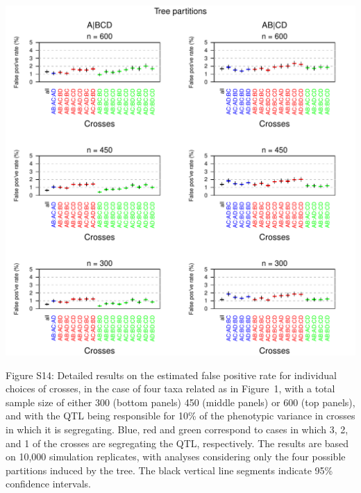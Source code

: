 \documentclass[letterpaper,twoside]{article}
\begin{document}
{\centering
\includegraphics{SuppFigs/detailedfp_treepart.pdf}}

\bigskip \noindent
Figure S14: Detailed results on the estimated false positive rate for individual
  choices of crosses, in the case of four taxa related as in Figure~1,
  with a total sample size of either 300 (bottom panels) 450 (middle
  panels) or 600 (top panels), and with the QTL being responsible
  for 10\% of the phenotypic variance in crosses in which it is
  segregating. Blue, red and green correspond to cases in which 3, 2,
  and 1 of the crosses are segregating the QTL, respectively.  The
  results are based on 10,000 simulation replicates, with analyses
  considering only the four possible partitions induced by the tree.
  The black vertical line segments indicate 95\% confidence intervals.

\newpage
\end{document}
